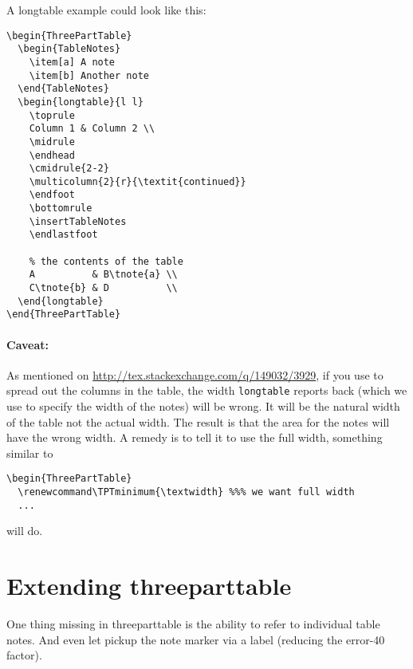 \documentclass[a4paper,article]{memoir}
\newcommand\env[1]{\texttt{#1}}
\newcommand\tpt{threeparttable\xspace}
\begin{document}
\noindent A longtable example could look like this:
\begin{lstlisting}
\begin{ThreePartTable}
  \begin{TableNotes}
    \item[a] A note
    \item[b] Another note
  \end{TableNotes}
  \begin{longtable}{l l}
    \toprule
    Column 1 & Column 2 \\
    \midrule
    \endhead
    \cmidrule{2-2}
    \multicolumn{2}{r}{\textit{continued}}
    \endfoot
    \bottomrule
    \insertTableNotes
    \endlastfoot

    % the contents of the table
    A          & B\tnote{a} \\
    C\tnote{b} & D          \\ 
  \end{longtable}
\end{ThreePartTable}
\end{lstlisting}

\paragraph{Caveat:} As mentioned on
\url{http://tex.stackexchange.com/q/149032/3929}, if you use 
to spread out the columns in the table, the width \env{longtable}
reports back (which we use to specify the width of the notes) will be
wrong. It will be the natural width of the table not the actual
width. The result is that the area for the notes will have the wrong
width. A remedy is to tell it to use the full width, something similar
to
\begin{lstlisting}
\begin{ThreePartTable}
  \renewcommand\TPTminimum{\textwidth} %%% we want full width
  ...
\end{lstlisting}
will do.


\section{Extending \tpt}
\label{sec:extending-tpt}

One thing missing in \tpt is the ability to refer to
individual table notes. And even let  pickup the note
marker via a label (reducing the error-40 factor).
\end{document}
